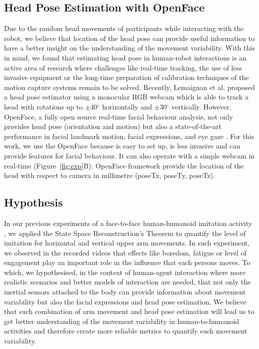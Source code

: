 \documentclass{sigchi}
\begin{document}
\subsection{Head Pose Estimation with OpenFace}
Due to the random head movements of participants while interacting with
the robot, we believe that location of the head pose can provide useful information
to have a better insight on the understanding of the movement variability.
With this in mind, we found that estimating head pose in human-robot interactions
is an active area of research where challenges like real-time tracking,
the use of less invasive equipment or the long-time preparation of calibration
techniques of the motion capture systems remain to be solved. Recently,
Lemaignan et al. \cite{Lemaignan2016}
proposed a head pose estimator using a monocular RGB webcam which is able to
track a head with rotations up to $\pm$40$^{\circ}$ horizontally and
$\pm$30$^{\circ}$ vertically.
However, OpenFace, a fully open source real-time facial behaviour analysis,
not only provides head pose (orientation and motion) but also a state-of-the-art
performance in facial landmark motion, facial expressions, and eye gaze
\cite{Baltrusaitis2016}.
For this work, we use the OpenFace because is easy to set up, is less invasive
and can provide features for facial behaviour. It can also operate with a
simple webcam in real-time (Figure~\ref{fig:exp}B).
OpenFace framework provide the location of the head with respect to camera
in millimetre (poseTx, poseTy, poseTz).


\subsection{Hypothesis}
In our previous experiments of a face-to-face human-humanoid imitation
activity \cite{Xochicale2017}, we applied the State Space Reconstruction's Theorem
to quantify the level of imitation for horizontal and vertical upper arm movements.
In such experiment, we observed in the recorded videos that effects like
boredom, fatigue or level of engagement play an important role in the influence
that each persons moves.
To which, we hypothesised, in the context of human-agent interaction
 where more realistic scenarios and better models of interaction are needed,
that not only the inertial sensors attached
to the body can provide information about movement variability but also the
facial expressions and head pose estimation.
We believe that such combination of arm movement and head pose estimation
will lead us to get better understanding of the movement variability in
human-to-humanoid activities and therefore create more reliable metrics to
quantify such movement variability.
\end{document}
